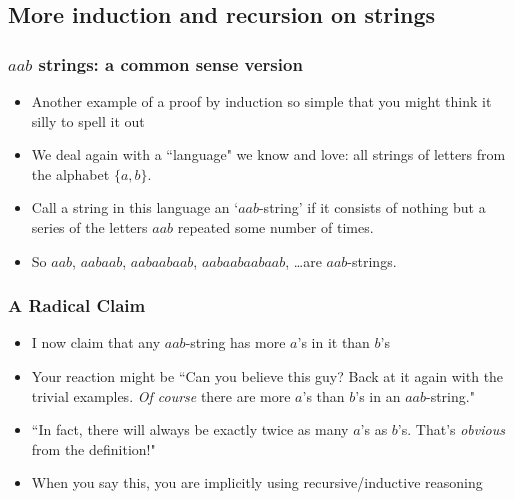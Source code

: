 \subsection{More induction and recursion on strings}


\begin{frame}
\frametitle{$aab$ strings: a common sense version}

\begin{itemize}[<+->]
\item Another example of a proof by induction so simple that you might think it silly to spell it out

\item We deal again with a ``language" we know and love: all strings of letters from the alphabet $\{a,b\}$.

\item Call a string in this language an `$aab$-string' if it consists of nothing but a series of the letters $aab$ repeated some number of times.

\item So $aab$, $aabaab$, $aabaabaab$, $aabaabaabaab$, \ldots  are $aab$-strings.

\end{itemize} 
\end{frame}

\begin{frame}
\frametitle{A Radical Claim}

\begin{itemize}[<+->]
\item I now claim that any $aab$-string has more $a$'s in it than $b$'s

\item Your reaction might be ``Can you believe this guy? Back at it again with the trivial examples. {\it{Of course}} there are more $a$'s than $b$'s in an $aab$-string."

\item ``In fact, there will always be exactly twice as many $a$'s as $b$'s. That's {\it{obvious}} from the definition!"

\item When you say this, you are implicitly using recursive/inductive reasoning

\end{itemize} 
\end{frame}


